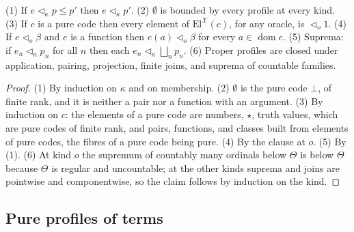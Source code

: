 \documentclass[10pt]{article}
\newcommand{\dom}{\operatorname{dom}}
\newcommand{\El}{\mathrm{El}}
\newcommand{\X}{\mathcal{X}}
\begin{document}
\begin{lemma}\label{lem:lhdbasic}
(1) If $e\lhd_\kappa p\le p'$ then $e\lhd_\kappa p'$. (2) $\emptyset$ is
bounded by every profile at every kind. (3) If $c$ is a pure code then
every element of $\El^\X(c)$, for any oracle, is $\lhd_o1$. (4) If
$e\lhd_o\beta$ and $e$ is a function then $e(a)\lhd_o\beta$ for every
$a\in\dom e$. (5) Suprema: if $e_n\lhd_\kappa p_n$ for all $n$ then each
$e_n\lhd_\kappa\bigsqcup_np_n$. (6) Proper profiles are closed under
application, pairing, projection, finite joins, and suprema of
countable families.
\end{lemma}
\begin{proof}
(1) By induction on $\kappa$ and on membership. (2) $\emptyset$ is the
pure code $\bot$, of finite rank, and it is neither a pair nor a function
with an argument. (3) By induction on $c$: the elements of a pure code
are numbers, $\star$, truth values, which are pure codes of finite rank,
and pairs, functions, and classes built from elements of pure codes,
the fibres of a pure code being pure. (4) By the clause at $o$. (5) By (1). (6) At kind
$o$ the supremum of countably many ordinals below $\Theta$ is below
$\Theta$ because $\Theta$ is regular and uncountable; at the other kinds
suprema and joins are pointwise and componentwise, so the claim follows
by induction on the kind.
\end{proof}

\subsection{Pure profiles of terms}
\end{document}
